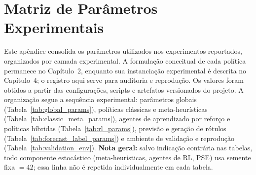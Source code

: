 
\appendix
\chapter{Matriz de Parâmetros Experimentais}
\label{app:reproducibility}

\renewcommand{\thetable}{A.\arabic{table}}
\setcounter{table}{0}

Este apêndice consolida os parâmetros utilizados nos experimentos reportados, organizados por camada experimental. A formulação conceitual de cada política permanece no Capítulo~2, enquanto sua instanciação experimental é descrita no Capítulo~4; o registro aqui serve para auditoria e reprodução. Os valores foram obtidos a partir das configurações, scripts e artefatos versionados do projeto. A organização segue a sequência experimental: parâmetros globais (Tabela~\ref{tab:global_params}), políticas clássicas e meta-heurísticas (Tabela~\ref{tab:classic_meta_params}), agentes de aprendizado por reforço e políticas híbridas (Tabela~\ref{tab:rl_params}), previsão e geração de rótulos (Tabela~\ref{tab:forecast_label_params}) e ambiente de validação e reprodução (Tabela~\ref{tab:validation_env}). \textbf{Nota geral:} salvo indicação contrária nas tabelas, todo componente estocástico (meta-heurísticas, agentes de RL, PSE) usa semente fixa $=42$; essa linha não é repetida individualmente em cada tabela.


